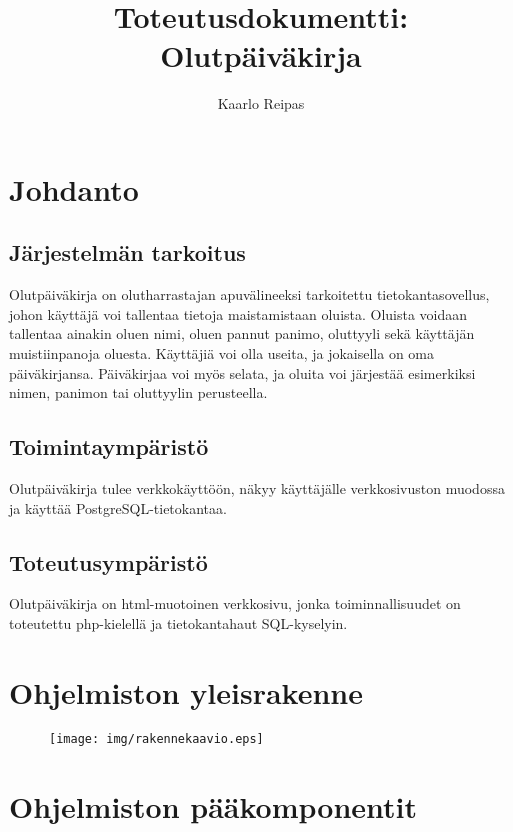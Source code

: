 \documentclass[12pt]{article}
\title{Toteutusdokumentti: Olutpäiväkirja}
\author{Kaarlo Reipas}
\begin{document}
\maketitle

\sloppy

\section{Johdanto}
\label{sec:johdanto}

\subsection{Järjestelmän tarkoitus}

Olutpäiväkirja on olutharrastajan apuvälineeksi tarkoitettu tietokantasovellus, johon käyttäjä voi tallentaa tietoja maistamistaan oluista. Oluista voidaan tallentaa ainakin oluen nimi, oluen pannut panimo, oluttyyli sekä käyttäjän muistiinpanoja oluesta. Käyttäjiä voi olla useita, ja jokaisella on oma päiväkirjansa. Päiväkirjaa voi myös selata, ja oluita voi järjestää esimerkiksi nimen, panimon tai oluttyylin perusteella.

\subsection{Toimintaympäristö}

Olutpäiväkirja tulee verkkokäyttöön, näkyy käyttäjälle verkkosivuston muodossa ja käyttää PostgreSQL-tietokantaa.

\subsection{Toteutusympäristö}

Olutpäiväkirja on html-muotoinen verkkosivu, jonka toiminnallisuudet on toteutettu php-kielellä ja tietokantahaut SQL-kyselyin.

\section{Ohjelmiston yleisrakenne}

\begin{figure}[H]
  \centering
  \texttt{[image: img/rakennekaavio.eps]}
\end{figure}

\section{Ohjelmiston pääkomponentit}
\end{document}
